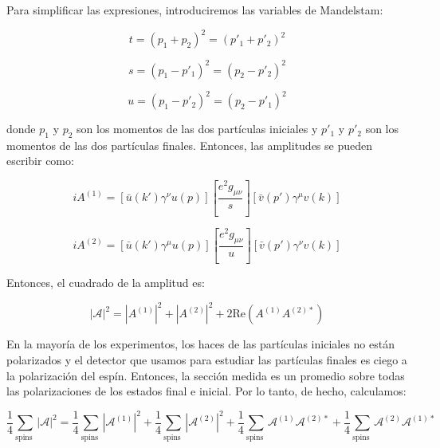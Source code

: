 Para simplificar las expresiones, introduciremos las variables de Mandelstam:

\begin{equation}
t = (p_1 + p_2)^2 = (p'_1 + p'_2)^2
\end{equation}

\begin{equation}
s = (p_1 - p'_1)^2 = (p_2 - p'_2)^2
\end{equation}

\begin{equation}
u = (p_1 - p'_2)^2 = (p_2 - p'_1)^2
\end{equation}

donde $ p_1 $ y $ p_2 $ son los momentos de las dos partículas iniciales y $ p'_1 $ y $ p'_2 $ son los momentos de las dos partículas finales. Entonces, las amplitudes se pueden escribir como:

\begin{equation}
iA^{(1)} = \left[ \bar{u}(k')\gamma^\nu u(p) \right] \left[ \frac{e^2 g_{\mu\nu}}{s} \right] \left[ \bar{v}(p')\gamma^\mu v(k) \right]
\end{equation}

\begin{equation}
iA^{(2)} = \left[ \bar{u}(k')\gamma^\mu u(p) \right] \left[ \frac{e^2 g_{\mu\nu}}{u} \right] \left[ \bar{v}(p')\gamma^\nu v(k) \right]
\end{equation}

Entonces, el cuadrado de la amplitud es:

\begin{equation}
|\mathcal{A}|^2 = |A^{(1)}|^2 + |A^{(2)}|^2 + 2 \text{Re} \left( A^{(1)} A^{(2)*} \right)
\end{equation}

En la mayoría de los experimentos, los haces de las partículas iniciales no están polarizados y el detector que usamos para estudiar las partículas finales es ciego a la polarización del espín. Entonces, la sección medida es un promedio sobre todas las polarizaciones de los estados final e inicial. Por lo tanto, de hecho, calculamos:

\begin{equation}
  \frac{1}{4} \sum_{\text {spins }}|\mathcal{A}|^2=\frac{1}{4} \sum_{\text {spins }}\left|\mathcal{A}^{(1)}\right|^2+\frac{1}{4} \sum_{\text {spins }}\left|\mathcal{A}^{(2)}\right|^2+\frac{1}{4} \sum_{\text {spins }} \mathcal{A}^{(1)} \mathcal{A}^{(2) *}+\frac{1}{4} \sum_{\text {spins }} \mathcal{A}^{(2)} \mathcal{A}^{(1) *}
  \end{equation}

